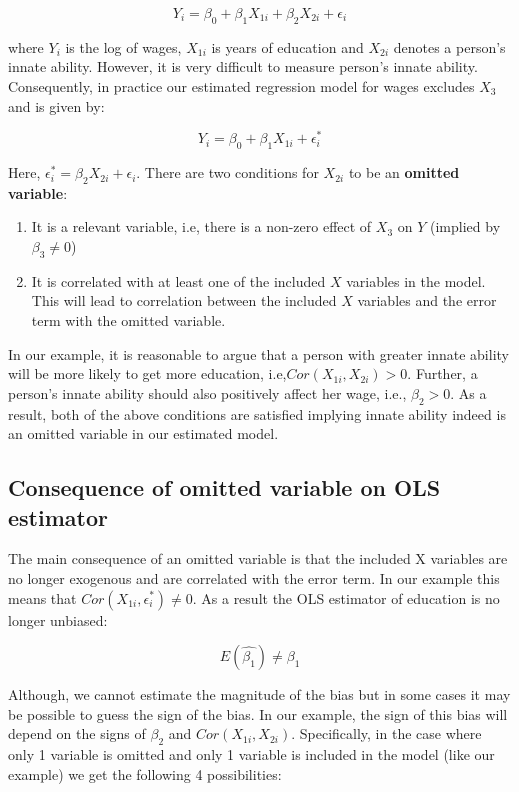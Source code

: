 \documentclass[
]{book}
\theoremstyle{definition}
\theoremstyle{definition}
\theoremstyle{definition}
\theoremstyle{definition}
\theoremstyle{remark}
\begin{document}
\[Y_i = \beta_0 + \beta_1 X_{1i} + \beta_2X_{2i}+\epsilon_i\]

where \(Y_i\) is the log of wages, \(X_{1i}\) is years of education and \(X_{2i}\) denotes a person's innate ability. However, it is very difficult to measure person's innate ability. Consequently, in practice our estimated regression model for wages excludes \(X_3\) and is given by:

\[Y_i = \beta_0 + \beta_1 X_{1i} + \epsilon_i^*\]

Here, \(\epsilon_i^*=\beta_2 X_{2i}+\epsilon_i\). There are two conditions for \(X_{2i}\) to be an \textbf{omitted variable}:

\begin{enumerate}
\def\labelenumi{\arabic{enumi}.}
\item
  It is a relevant variable, i.e, there is a non-zero effect of \(X_3\) on \(Y\) (implied by \(\beta_3\neq 0\))
\item
  It is correlated with at least one of the included \(X\) variables in the model. This will lead to correlation between the included \(X\) variables and the error term with the omitted variable.
\end{enumerate}

In our example, it is reasonable to argue that a person with greater innate ability will be more likely to get more education, i.e,\(Cor(X_{1i},X_{2i})>0\). Further, a person's innate ability should also positively affect her wage, i.e., \(\beta_2>0\). As a result, both of the above conditions are satisfied implying innate ability indeed is an omitted variable in our estimated model.

\hypertarget{consequence-of-omitted-variable-on-ols-estimator}{%
\subsection{Consequence of omitted variable on OLS estimator}\label{consequence-of-omitted-variable-on-ols-estimator}}

The main consequence of an omitted variable is that the included X variables are no longer exogenous and are correlated with the error term. In our example this means that \(Cor(X_{1i},\epsilon^*_i)\neq 0\). As a result the OLS estimator of education is no longer unbiased:

\[E(\widehat{\beta_1}) \neq \beta_1\]

Although, we cannot estimate the magnitude of the bias but in some cases it may be possible to guess the sign of the bias. In our example, the sign of this bias will depend on the signs of \(\beta_2\) and \(Cor(X_{1i},X_{2i})\). Specifically, in the case where only 1 variable is omitted and only 1 variable is included in the model (like our example) we get the following 4 possibilities:
\end{document}
